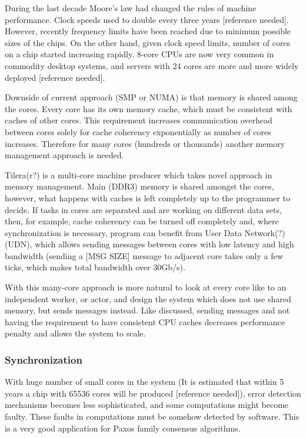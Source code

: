 \documentclass[english,11pt]{article}
\begin{document}
During the last decade Moore's law had changed the rules of machine
performance. Clock speeds used to double every three years [reference needed].
However, recently frequency limits have been reached due to minimum possible
sizes of the chips. On the other hand, given clock speed limits, number of
cores on a chip started increasing rapidly. 8-core CPUs are now very common in
commodity desktop systems, and servers with 24 cores are more and more widely
deployed [reference needed].

Downside of current approach (SMP or NUMA) is that memory is shared among the
cores. Every core has its own memory cache, which must be consistent with
caches of other cores. This requirement increases communication overhead
between cores solely for cache coherency exponentially as number of cores
increases. Therefore for many cores (hundreds or thousands) another memory
management approach is needed.

Tilera(r?) is a multi-core machine producer which takes novel approach in
memory management. Main (DDR3) memory is shared amongst the cores, however,
what happens with caches is left completely up to the programmer to decide.  If
tasks in cores are separated and are working on different data sets, then, for
example, cache coherency can be turned off completely and, where
synchronization is necessary, program can benefit from User Data Network(?)
(UDN), which allows sending messages between cores with low latency and high
bandwidth (sending a [MSG SIZE] message to adjacent core takes only a few ticks,
which makes total bandwidth over 30Gb/s).

With this many-core approach is more natural to look at every core like to an
independent worker, or actor, and design the system which does not use shared
memory, but sends messages instead. Like discussed, sending messages and not
having the requirement to have consistent CPU caches decreases performance
penalty and allows the system to scale.

\subsubsection{Synchronization}

With huge number of small cores in the system (It is estimated that within 5
years a chip with 65536 cores will be produced [reference needed]), error
detection mechanisms becomes less sophisticated, and some computations might
become faulty. These faults in computations must be somehow detected by
software. This is a very good application for Paxos family consensus
algorithms.
\end{document}
